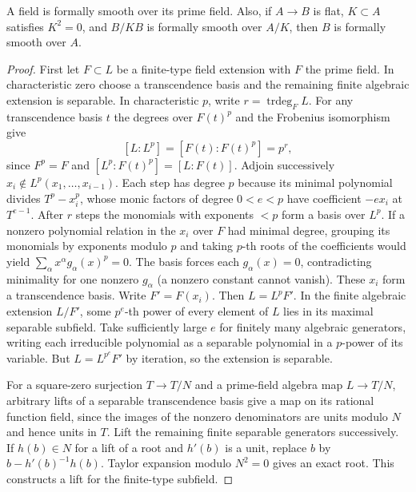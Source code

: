 \begin{lemma}\label{res:C01}
A field is formally smooth over its prime field. Also, if
\(A\to B\) is flat, \(K\subset A\) satisfies \(K^2=0\), and
\(B/KB\) is formally smooth over \(A/K\), then \(B\) is formally
smooth over \(A\).
\end{lemma}
\begin{proof}
First let \(F\subset L\) be a finite-type field extension with \(F\)
the prime field. In characteristic zero choose a transcendence basis
and the remaining finite algebraic extension is separable. In
characteristic \(p\), write \(r=\operatorname{trdeg}_F L\).
For any transcendence basis \(t\) the degrees over \(F(t)^p\)
and the Frobenius isomorphism give
\[
 [L:L^p]=[F(t):F(t)^p]=p^r,
\]
since \(F^p=F\) and \([L^p:F(t)^p]=[L:F(t)]\). Adjoin successively
\(x_i\notin L^p(x_1,\ldots,x_{i-1})\). Each step has degree \(p\) because
its minimal polynomial divides \(T^p-x_i^p\), whose monic factors of
degree \(0<e<p\) have coefficient \(-e x_i\) at \(T^{e-1}\).
After \(r\) steps the monomials with exponents \(<p\) form a basis
over \(L^p\). If a nonzero polynomial relation in the \(x_i\) over
\(F\) had minimal degree, grouping its monomials by exponents modulo
\(p\) and taking \(p\)-th roots of the coefficients would yield
\(\sum_\alpha x^\alpha g_\alpha(x)^p=0\).
The basis forces each \(g_\alpha(x)=0\), contradicting minimality for
one nonzero \(g_\alpha\) (a nonzero constant cannot vanish).
These \(x_i\) form a transcendence basis. Write \(F'=F(x_i)\).
Then \(L=L^pF'\). In the finite algebraic extension \(L/F'\), some
\(p^e\)-th power of every element of \(L\) lies in its maximal separable
subfield. Take sufficiently large \(e\) for finitely many algebraic
generators, writing each irreducible polynomial as a separable
polynomial in a \(p\)-power of its variable. But \(L=L^{p^e}F'\) by
iteration, so the extension is separable.

For a square-zero surjection \(T\to T/N\) and a prime-field algebra
map \(L\to T/N\), arbitrary lifts of a separable transcendence basis
give a map on its rational function field, since the images of the
nonzero denominators are units modulo \(N\) and hence units in \(T\).
Lift the remaining finite separable generators successively. If
\(h(b)\in N\) for a lift of a root and \(h'(b)\) is a unit,
replace \(b\) by \(b-h'(b)^{-1}h(b)\). Taylor expansion modulo
\(N^2=0\) gives an exact root. This constructs a lift for the
finite-type subfield.


\end{proof}
